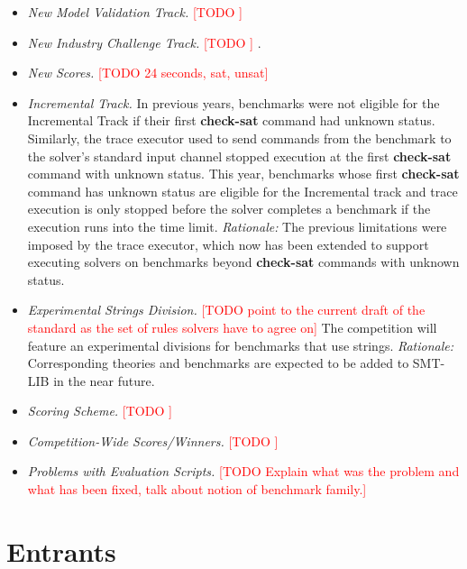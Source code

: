 \documentclass[12pt]{article}
\newcommand{\akey}[1]{\textbf{#1}}
\newcommand{\rem}[1]{\textcolor{red}{[#1]}}
\newcommand{\todo}[1]{\rem{TODO #1}}
\newcommand{\incremental}{Incremental\xspace}
\newcommand{\mval}{Model Validation\xspace}
\newcommand{\challenge}{Industry Challenge\xspace}
\begin{document}
\begin{itemize}
  \item {\it New \mval Track.} \todo{}

  \item {\it New \challenge Track.} \todo{}
.
  \item {\it New Scores.} \todo{24 seconds, sat, unsat}

  \item {\it Incremental Track.}
    In previous years, benchmarks were not eligible for the \incremental Track
    if their first \akey{check-sat} command had unknown status.  Similarly, the
    trace executor used to send commands from the benchmark to the solver's
    standard input channel stopped execution at the first \akey{check-sat}
    command with unknown status. This year, benchmarks whose first
    \akey{check-sat} command has unknown status are eligible for the
    \incremental track and trace execution is only stopped before the solver
    completes a benchmark if the execution runs into the time limit.
    \emph{Rationale:} The previous limitations were imposed by the trace
    executor, which now has been extended to support executing solvers on
    benchmarks beyond \akey{check-sat} commands with unknown status.

  \item {\it Experimental Strings Division.}
    \todo{point to the current draft of the standard as the set of rules
    solvers have to agree on}
    The competition will feature an experimental divisions for
  benchmarks that use strings.  \emph{Rationale:} Corresponding
  theories and benchmarks are expected to be added to SMT-LIB in the
  near future.

  \item {\it Scoring Scheme.} \todo{}

  \item {\it Competition-Wide Scores/Winners.} \todo{}

  \item {\it Problems with Evaluation Scripts.} \todo{Explain what was the
    problem and what has been fixed, talk about notion of benchmark family.}

\end{itemize}


\section{Entrants}
\label{sec:entrants}
\end{document}

